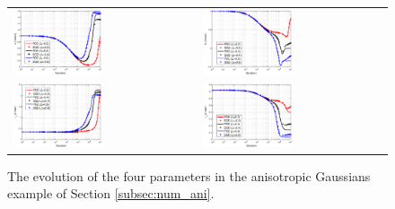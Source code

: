 \documentclass[11pt]{article}
\begin{document}
\begin{figure}[]
	\begin{center}
		\begin{tabular}{ll}
			\includegraphics[width=0.5\textwidth]{aniPDE_a_J400_d320_k60_n800.eps}
			&
			\includegraphics[width=0.5\textwidth]{aniPDE_b_J400_d320_k60_n800.eps}\\			
			\includegraphics[width=0.5\textwidth]{aniPDE_r1_J400_d320_k60_n800.eps}
			&
			\includegraphics[width=0.5\textwidth]{aniPDE_r2_J400_d320_k60_n800.eps}
		\end{tabular}
	\end{center}
	\caption{The evolution of the four parameters in the anisotropic Gaussians example of Section \ref{subsec:num_ani}.}
	\label{fig:num_ani_parameters}
\end{figure}
\end{document}
